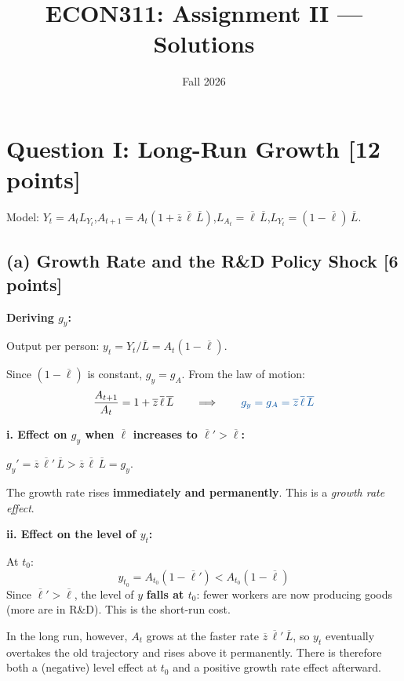 \documentclass[letterpaper,12pt]{article}
\title{ECON311: Assignment II --- Solutions}
\author{}
\date{Fall 2026}
\begin{document}
\maketitle
\vspace{-.4in}


\section*{Question I: Long-Run Growth [12 points]}

\noindent Model: $Y_t = A_t L_{Y_t}$,\quad $A_{t+1} = A_t(1 + \overline{z}\,\overline{\ell}\,\overline{L})$,\quad $L_{A_t} = \overline{\ell}\,\overline{L}$,\quad $L_{Y_t} = (1-\overline{\ell})\,\overline{L}$.

\subsection*{(a) Growth Rate and the R\&D Policy Shock [6 points]}

\noindent\textbf{Deriving $g_y$:}

Output per person: $y_t = Y_t/\overline{L} = A_t(1-\overline{\ell})$.

Since $(1-\overline{\ell})$ is constant, $g_y = g_A$. From the law of motion:
\[
\frac{A_{t+1}}{A_t} = 1 + \overline{z}\,\overline{\ell}\,\overline{L} \qquad \Longrightarrow \qquad \textcolor{sol}{g_y = g_A = \overline{z}\,\overline{\ell}\,\overline{L}}
\]

\noindent\textbf{i. Effect on $g_y$ when $\overline{\ell}$ increases to $\overline{\ell}' > \overline{\ell}$:}

\textcolor{sol}{$g_y' = \overline{z}\,\overline{\ell}'\,\overline{L} > \overline{z}\,\overline{\ell}\,\overline{L} = g_y$.}

The growth rate rises \textbf{immediately and permanently}. This is a \emph{growth rate effect}.

\noindent\textbf{ii. Effect on the level of $y_t$:}

At $t_0$:
\[
y_{t_0} = A_{t_0}(1-\overline{\ell}') < A_{t_0}(1-\overline{\ell})
\]
Since $\overline{\ell}' > \overline{\ell}$, the level of $y$ \textbf{falls at $t_0$}: fewer workers are now producing goods (more are in R\&D). This is the short-run cost.

In the long run, however, $A_t$ grows at the faster rate $\overline{z}\,\overline{\ell}'\,\overline{L}$, so $y_t$ eventually overtakes the old trajectory and rises above it permanently. There is therefore both a (negative) level effect at $t_0$ and a positive growth rate effect afterward.
\end{document}
